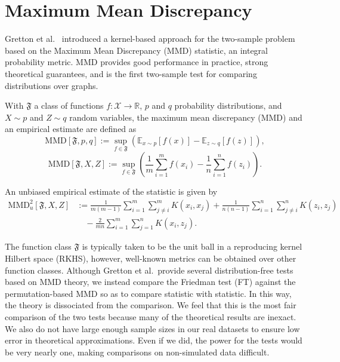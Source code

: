 \section{Maximum Mean Discrepancy}
\label{S:MMD}
Gretton et al.\ \cite{gretton19m, gretton2010fast, gretton2012kernel,
  borgwardt2006integrating} introduced a kernel-based approach for
the two-sample problem based on the Maximum Mean Discrepancy (MMD)
statistic, an integral probability metric.  MMD provides good
performance in practice, strong theoretical guarantees, and is the
first two-sample test for comparing distributions over graphs.

\begin{definition}
  With $\mathfrak{F}$ a class of functions $f:\mathcal{X} \to
  \mathbb{R}$, $p$ and $q$ probability distributions, and $X \sim p$
  and $Z \sim q$ random variables, the maximum mean discrepancy (MMD)
  and an empirical estimate are defined as
  \begin{equation*}
    \text{MMD}[\mathfrak{F},p,q] := \sup_{f\in
      \mathfrak{F}}(\mathbb{E}_{x\sim p}[f(x)] - \mathbb{E}_{z\sim q}[f(z)]),
  \end{equation*}
  \begin{equation*}
    \text{MMD}[\mathfrak{F},X,Z] := \sup_{f\in
      \mathfrak{F}}\left (\frac{1}{m}\sum_{i=1}^mf(x_i) -
    \frac{1}{n}\sum_{i=1}^{n} f(z_i) \right ).
  \end{equation*}
\end{definition}

An unbiased empirical estimate \cite{gretton2012kernel} of
the statistic is given by
\begin{equation*}
  \begin{split}
      \text{MMD}^2_u[\mathfrak{F},X,Z] &:=
      \frac{1}{m(m-1)} \sum_{i=1}^m \sum_{j \neq i}^m K(x_i, x_j) +
      \frac{1}{n(n-1)} \sum_{i=1}^n \sum_{j \neq i}^n K(z_i, z_j) \\
      &\quad - \frac{2}{mn} \sum_{i=1}^m \sum_{j = 1}^n K(x_i, z_j).
  \end{split}
\end{equation*}

The function class $\mathfrak{F}$ is typically taken to be the unit ball in a
reproducing kernel Hilbert space (RKHS), however, well-known metrics
can be obtained over other function classes.  Although Gretton et
al.\ provide several distribution-free tests based on MMD theory, we
instead compare the Friedman test (FT) against the permutation-based
MMD so as to compare statistic with statistic.  In this way, the
theory is dissociated from the comparison.  We feel that this is the
most fair comparison of the two tests because many of the theoretical
results are inexact.  We also do not have large enough sample sizes in
our real datasets to ensure low error in theoretical approximations.
Even if we did, the power for the tests would be very nearly one,
making comparisons on non-simulated data difficult.

